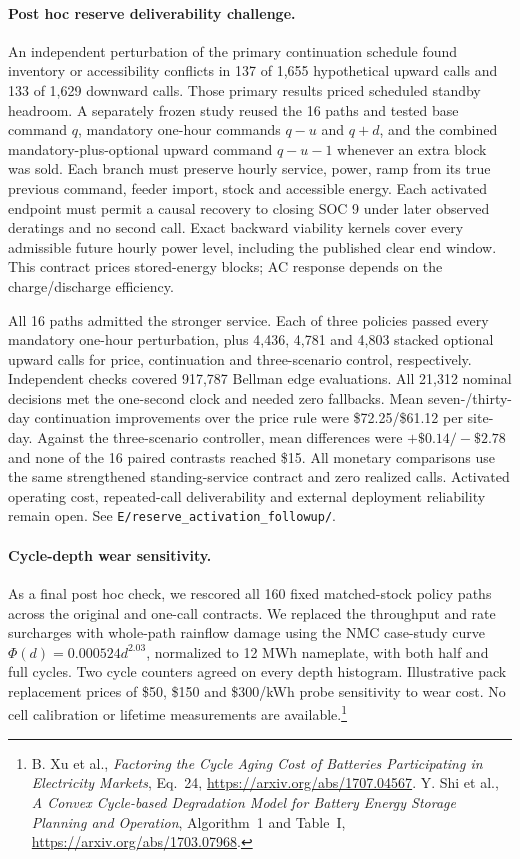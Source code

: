 \documentclass[10pt,letterpaper]{article}
\begin{document}
\paragraph{Post hoc reserve deliverability challenge.}
An independent perturbation of the primary continuation schedule found inventory or accessibility conflicts in 137 of 1,655 hypothetical upward calls and 133 of 1,629 downward calls. Those primary results priced scheduled standby headroom. A separately frozen study reused the 16 paths and tested base command $q$, mandatory one-hour commands $q-u$ and $q+d$, and the combined mandatory-plus-optional upward command $q-u-1$ whenever an extra block was sold. Each branch must preserve hourly service, power, ramp from its true previous command, feeder import, stock and accessible energy. Each activated endpoint must permit a causal recovery to closing SOC 9 under later observed deratings and no second call. Exact backward viability kernels cover every admissible future hourly power level, including the published clear end window. This contract prices stored-energy blocks; AC response depends on the charge/discharge efficiency.

All 16 paths admitted the stronger service. Each of three policies passed every mandatory one-hour perturbation, plus 4,436, 4,781 and 4,803 stacked optional upward calls for price, continuation and three-scenario control, respectively. Independent checks covered 917,787 Bellman edge evaluations. All 21,312 nominal decisions met the one-second clock and needed zero fallbacks. Mean seven-/thirty-day continuation improvements over the price rule were \$72.25/\$61.12 per site-day. Against the three-scenario controller, mean differences were $+\$0.14/-\$2.78$ and none of the 16 paired contrasts reached \$15. All monetary comparisons use the same strengthened standing-service contract and zero realized calls. Activated operating cost, repeated-call deliverability and external deployment reliability remain open. See \texttt{E/reserve\_activation\_followup/}.
\paragraph{Cycle-depth wear sensitivity.}
As a final post hoc check, we rescored all 160 fixed matched-stock policy paths across the original and one-call contracts. We replaced the throughput and rate surcharges with whole-path rainflow damage using the NMC case-study curve $\Phi(d)=0.000524d^{2.03}$, normalized to 12 MWh nameplate, with both half and full cycles. Two cycle counters agreed on every depth histogram. Illustrative pack replacement prices of \$50, \$150 and \$300/kWh probe sensitivity to wear cost. No cell calibration or lifetime measurements are available.\footnote{B. Xu et al., \emph{Factoring the Cycle Aging Cost of Batteries Participating in Electricity Markets}, Eq.~24, \url{https://arxiv.org/abs/1707.04567}. Y. Shi et al., \emph{A Convex Cycle-based Degradation Model for Battery Energy Storage Planning and Operation}, Algorithm~1 and Table~I, \url{https://arxiv.org/abs/1703.07968}.}
\end{document}

